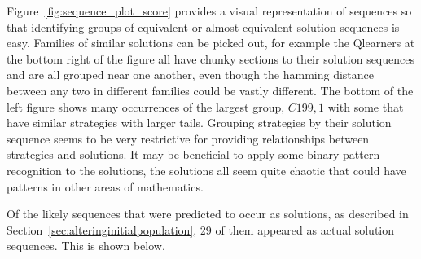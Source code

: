 Figure~\ref{fig:sequence_plot_score} provides a visual representation of sequences so that identifying groups of equivalent or almost equivalent solution sequences is easy.
Families of similar solutions can be picked out, for example the Qlearners at the bottom right of the figure all have chunky sections to their solution sequences and are all grouped near one another, even though the hamming distance between any two in different families could be vastly different.
The bottom of the left figure shows many occurrences of the largest group, $C199,1$ with some that have similar strategies with larger tails.
Grouping strategies by their solution sequence seems to be very restrictive for providing relationships between strategies and solutions. 
It may be beneficial to apply some binary pattern recognition to the solutions, the solutions all seem quite chaotic that could have patterns in other areas of mathematics.

Of the likely sequences that were predicted to occur as solutions, as described in Section~\ref{sec:alteringinitialpopulation}, 29 of them appeared as actual solution sequences. 
This is shown below.

